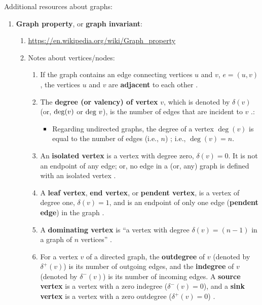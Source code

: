 Additional resources about graphs: \vspace{-0.3cm}
\begin{enumerate} \itemsep -4pt
\item {\bf Graph property}, or {\bf graph invariant}: \vspace{-0.3cm}
	\begin{enumerate} \itemsep -2pt
	\item \url{https://en.wikipedia.org/wiki/Graph_property}
	\item Notes about vertices/nodes: \vspace{-0.2cm}
		\begin{enumerate} %
		\item If the graph contains an edge connecting vertices $u$ and $v$, $e = (u, v)$, the vertices $u$ and $v$ are {\bf adjacent} to each other \cite{WikipediaContributors2017a11}.
		\item The {\bf degree (or valency) of vertex} $v$, which is denoted by $\delta(v)$ (or, ${\rm deg}(v)$ or ${\rm deg}\ v$), is the number of edges that are incident to $v$ \cite{WikipediaContributors2017a11,WikipediaContributors2018a37}.: \vspace{-0.1cm}
			\begin{itemize} \itemsep -1pt
			\item Regarding undirected graphs, the degree of a vertex $\deg(v)$ is equal to the number of edges (i.e., $n$) \cite{WikipediaContributors2017a13}; i.e., $\deg(v) = n$.
			\end{itemize}
		\item An {\bf isolated vertex} is a vertex with degree zero, $\delta(v) = 0$. It is not an endpoint of any edge; or, no edge in a (or, any) graph is defined with an isolated vertex \cite{WikipediaContributors2018a37,WikipediaContributors2017a11}.
		\item A {\bf leaf vertex}, {\bf end vertex}, or {\bf pendent vertex}, is a vertex of degree one, $\delta(v) = 1$, and is an endpoint of only one edge ({\bf pendent edge}) in the graph \cite{WikipediaContributors2018a37,WikipediaContributors2017a11}.
		\item A {\bf dominating vertex} is ``a vertex with degree $\delta(v) = (n - 1)$ in a graph of $n$ vertices'' \cite{WikipediaContributors2018a37}.
		\item For a vertex $v$ of a directed graph, the {\bf outdegree} of $v$ (denoted by $\delta^{+}(v)$) is its number of outgoing edges, and the {\bf indegree} of $v$ (denoted by $\delta^{-}(v)$) is its number of incoming edges. A {\bf source vertex} is a vertex with a zero indegree ($\delta^{-}(v) = 0$), and a {\bf sink vertex} is a vertex with a zero outdegree ($\delta^{+}(v) = 0$) \cite{WikipediaContributors2017a11}.

\end{enumerate}
\end{enumerate}
\end{enumerate}
